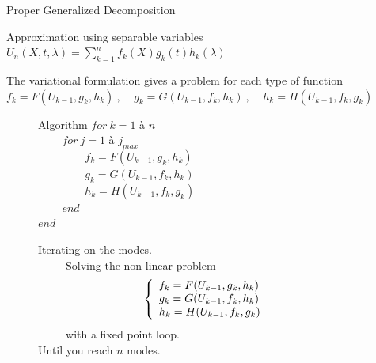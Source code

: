 \documentclass[10pt,a4paper]{beamer}
\begin{document}
\begin{frame}{Proper Generalized Decomposition}
	
	\begin{alertblock}{Approximation using separable variables}
	$ \displaystyle U_n(X,t,\lambda) = \sum_{k=1}^n 
											f_k(X) g_k(t) h_k(\lambda)$
	\end{alertblock}
	\vspace{-0.1cm}
	\begin{alertblock}{The variational formulation gives a problem for each type of function}
	$ f_k = F (U_{k-1},g_k,h_k)~,~~~~~
	 g_k = G (U_{k-1},f_k,h_k)~,~~~~~
	 h_k = H (U_{k-1},f_k,g_k)$
	\end{alertblock}
	\vspace{-0.4cm}
	\begin{figure}[t]
	   \begin{minipage}[l]{0.40\linewidth}
			\begin{alertblock}{Algorithm}
				$ for~k = 1$ à $ n$ \\
				$ \phantom{for~k} for~j=1$ à $j_{max}$ \\
				$ \phantom{for~k for~j } f_k = F (U_{k-1},g_k,h_k)$ \\
				$ \phantom{for~k for~j } g_k = G (U_{k-1},f_k,h_k)$ \\
				$ \phantom{for~k for~j } h_k = H (U_{k-1},f_k,g_k)$ \\
				$ \phantom{for~k} end$ \\
				$end $ \\				
			\end{alertblock}
	   \end{minipage}\hfill
	   \begin{minipage}{0.54\linewidth}
			\begin{alertblock}{}
				Iterating on the modes. \\
				$ \phantom{for~k}$ Solving the non-linear problem\\
				\[
				\left\{
				\begin{array}{l l}
				&\!\!\!\!\!\!f_k = F (U_{k-1},g_k,h_k) \\
				&\!\!\!\!\!\!g_k = G (U_{k-1},f_k,h_k) \\
				&\!\!\!\!\!\!h_k = H (U_{k-1},f_k,g_k) \\				
				\end{array}	
				\right.			
				\]
				$ \phantom{for~k}$ with a fixed point loop. \\
				Until you reach $n$ modes.\\		
			\end{alertblock}
	   \end{minipage}
	\end{figure}
	\vfill
	
\end{frame}
\end{document}
